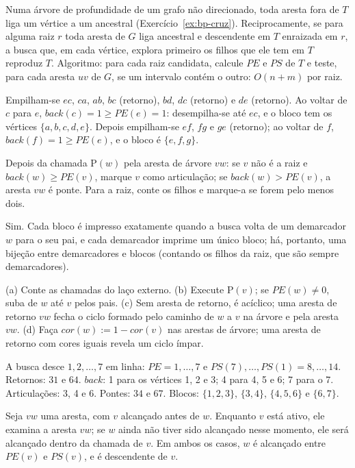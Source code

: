  Numa árvore de profundidade de um grafo não direcionado, toda aresta fora de $T$ liga um vértice a um ancestral (Exercício~\ref{ex:bp-cruz}). Reciprocamente, se para alguma raiz $r$ toda aresta de $G$ liga ancestral e descendente em $T$ enraizada em $r$, a busca que, em cada vértice, explora primeiro os filhos que ele tem em $T$ reproduz $T$. Algoritmo: para cada raiz candidata, calcule $PE$ e $PS$ de $T$ e teste, para cada aresta $uv$ de $G$, se um intervalo contém o outro: $O(n+m)$ por raiz.

 Empilham-se $ec$, $ca$, $ab$, $bc$ (retorno), $bd$, $dc$ (retorno) e $de$ (retorno). Ao voltar de $c$ para $e$, $back(c)=1\ge PE(e)=1$: desempilha-se até $ec$, e o bloco tem os vértices $\{a,b,c,d,e\}$. Depois empilham-se $ef$, $fg$ e $ge$ (retorno); ao voltar de $f$, $back(f)=1\ge PE(e)$, e o bloco é $\{e,f,g\}$.

 Depois da chamada \textsc{P}$(w)$ pela aresta de árvore $vw$: se $v$ não é a raiz e $back(w)\ge PE(v)$, marque $v$ como articulação; se $back(w)>PE(v)$, a aresta $vw$ é ponte. Para a raiz, conte os filhos e marque-a se forem pelo menos dois.

 Sim. Cada bloco é impresso exatamente quando a busca volta de um demarcador $w$ para o seu pai, e cada demarcador imprime um único bloco; há, portanto, uma bijeção entre demarcadores e blocos (contando os filhos da raiz, que são sempre demarcadores).

 (a) Conte as chamadas do laço externo. (b) Execute \textsc{P}$(v)$; se $PE(w)\ne0$, suba de $w$ até $v$ pelos pais. (c) Sem aresta de retorno, é acíclico; uma aresta de retorno $vw$ fecha o ciclo formado pelo caminho de $w$ a $v$ na árvore e pela aresta $vw$. (d) Faça $cor(w):=1-cor(v)$ nas arestas de árvore; uma aresta de retorno com cores iguais revela um ciclo ímpar.

 A busca desce $1,2,\dots,7$ em linha: $PE=1,\dots,7$ e $PS(7),\dots,PS(1)=8,\dots,14$. Retornos: $31$ e $64$. $back$: 1 para os vértices 1, 2 e 3; 4 para 4, 5 e 6; 7 para o 7. Articulações: 3, 4 e 6. Pontes: $34$ e $67$. Blocos: $\{1,2,3\}$, $\{3,4\}$, $\{4,5,6\}$ e $\{6,7\}$.

 Seja $vw$ uma aresta, com $v$ alcançado antes de $w$. Enquanto $v$ está ativo, ele examina a aresta $vw$; se $w$ ainda não tiver sido alcançado nesse momento, ele será alcançado dentro da chamada de $v$. Em ambos os casos, $w$ é alcançado entre $PE(v)$ e $PS(v)$, e é descendente de $v$.

